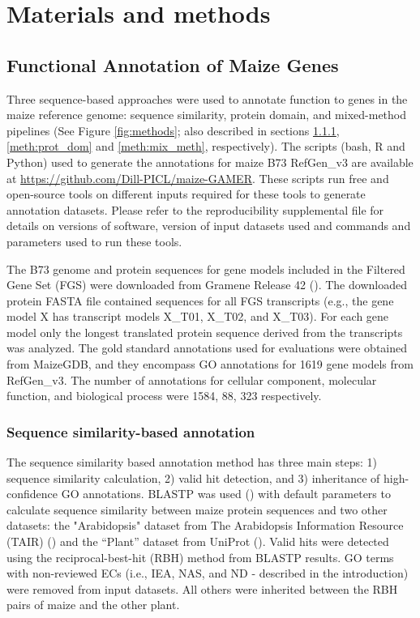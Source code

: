 \section{Materials and methods}

\subsection{Functional Annotation of Maize Genes}
Three sequence-based approaches were used to annotate function to genes in the maize reference genome: sequence similarity, protein domain, and mixed-method pipelines (See Figure \ref{fig:methods}; also described in sections \ref{meth:seq_sim}, \ref{meth:prot_dom} and \ref{meth:mix_meth}, respectively). The scripts (bash, R and Python) used to generate the annotations for maize B73 RefGen\_v3 are available at  \href{https://github.com/Dill-PICL/maize-GAMER}{https://github.com/Dill-PICL/maize-GAMER}. These scripts run free and open-source tools on different inputs required for these tools to generate annotation datasets. Please refer to the reproducibility supplemental file for details on versions of software, version of input datasets used and commands and parameters used to run these tools.

The B73 genome and protein sequences for gene models included in the Filtered Gene Set (FGS) were downloaded from Gramene Release 42 (\cite{telloruiz_2016-qu}). The downloaded protein FASTA file contained sequences for all FGS transcripts (e.g., the gene model X has transcript models X\_T01, X\_T02, and X\_T03). For each gene model only the longest translated protein sequence derived from the transcripts was analyzed. The gold standard annotations used for evaluations were obtained from MaizeGDB, and they encompass GO annotations for \num{1619} gene models from RefGen\_v3. The number of annotations for cellular component, molecular function, and biological process were \num{1584}, \num{88}, \num{323} respectively.

\subsubsection{Sequence similarity-based annotation} \label{meth:seq_sim}
The sequence similarity based annotation method has three main steps: 1) sequence similarity calculation, 2) valid hit detection, and 3) inheritance of high-confidence GO annotations. BLASTP was used (\cite{altschul_1990-O4}) with default parameters to calculate sequence similarity between maize protein sequences and two other datasets: the "Arabidopsis" dataset from The Arabidopsis Information Resource (TAIR) (\cite{berardini_2015-Nk}) and the “Plant” dataset from UniProt (\cite{uniprotconsortium_2015-Ky}). Valid hits were detected using the reciprocal-best-hit (RBH) method from BLASTP results. GO terms with non-reviewed ECs (i.e., IEA, NAS, and ND - described in the introduction) were removed from input datasets. All others were inherited between the RBH pairs of maize and the other plant.


